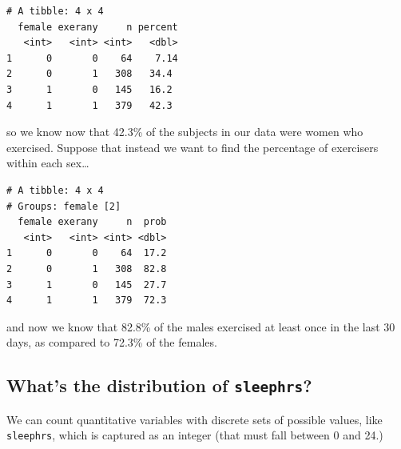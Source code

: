 \documentclass[]{book}
\newenvironment{Shaded}{\begin{snugshade}}{\end{snugshade}}
\newcommand{\KeywordTok}[1]{\textcolor[rgb]{0.13,0.29,0.53}{\textbf{#1}}}
\newcommand{\DataTypeTok}[1]{\textcolor[rgb]{0.13,0.29,0.53}{#1}}
\newcommand{\DecValTok}[1]{\textcolor[rgb]{0.00,0.00,0.81}{#1}}
\newcommand{\StringTok}[1]{\textcolor[rgb]{0.31,0.60,0.02}{#1}}
\newcommand{\OperatorTok}[1]{\textcolor[rgb]{0.81,0.36,0.00}{\textbf{#1}}}
\newcommand{\NormalTok}[1]{#1}
\theoremstyle{definition}
\theoremstyle{definition}
\theoremstyle{definition}
\theoremstyle{remark}
\begin{document}
\begin{verbatim}
# A tibble: 4 x 4
  female exerany     n percent
   <int>   <int> <int>   <dbl>
1      0       0    64    7.14
2      0       1   308   34.4 
3      1       0   145   16.2 
4      1       1   379   42.3 
\end{verbatim}

so we know now that 42.3\% of the subjects in our data were women who
exercised. Suppose that instead we want to find the percentage of
exercisers within each sex\ldots{}

\begin{Shaded}
\end{Shaded}

\begin{verbatim}
# A tibble: 4 x 4
# Groups: female [2]
  female exerany     n  prob
   <int>   <int> <int> <dbl>
1      0       0    64  17.2
2      0       1   308  82.8
3      1       0   145  27.7
4      1       1   379  72.3
\end{verbatim}

and now we know that 82.8\% of the males exercised at least once in the
last 30 days, as compared to 72.3\% of the females.

\subsection{\texorpdfstring{What's the distribution of
\texttt{sleephrs}?}{What's the distribution of sleephrs?}}\label{whats-the-distribution-of-sleephrs}

We can count quantitative variables with discrete sets of possible
values, like \texttt{sleephrs}, which is captured as an integer (that
must fall between 0 and 24.)

\begin{Shaded}
\end{Shaded}
\end{document}
